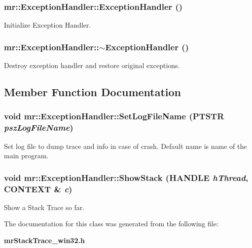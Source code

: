 \subsubsection{\setlength{\rightskip}{0pt plus 5cm}mr::Exception\-Handler::Exception\-Handler ()}\label{classmr_1_1ExceptionHandler_a0}


Initialize Exception Handler. 

\subsubsection{\setlength{\rightskip}{0pt plus 5cm}mr::Exception\-Handler::$\sim${\bf Exception\-Handler} ()}\label{classmr_1_1ExceptionHandler_a1}


Destroy exception handler and restore original exceptions. 



\subsection{Member Function Documentation}
\subsubsection{\setlength{\rightskip}{0pt plus 5cm}void mr::Exception\-Handler::Set\-Log\-File\-Name (PTSTR {\em psz\-Log\-File\-Name})\hspace{0.3cm}{\tt  [static]}}\label{classmr_1_1ExceptionHandler_e1}


Set log file to dump trace and info in case of crash. Default name is name of the main program. 
\subsubsection{\setlength{\rightskip}{0pt plus 5cm}void mr::Exception\-Handler::Show\-Stack (HANDLE {\em h\-Thread}, CONTEXT \& {\em c})\hspace{0.3cm}{\tt  [static]}}\label{classmr_1_1ExceptionHandler_e0}


Show a Stack Trace so far. 



The documentation for this class was generated from the following file:\begin{CompactItemize}
\item 
{\bf mr\-Stack\-Trace\_\-win32.h}\end{CompactItemize}
